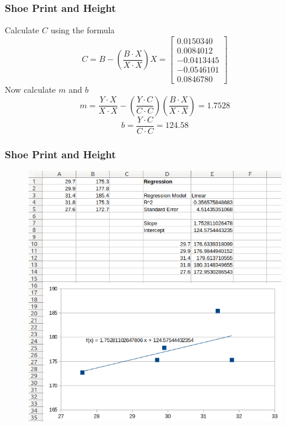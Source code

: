 \documentclass[xcolor=dvipsnames]{beamer}
\begin{document}
\begin{frame}
  \frametitle{Shoe Print and Height}
  Calculate $C$ using the formula
  \begin{equation}
    \label{eq:chawohph}
    C=B-\left(\frac{B\cdot{}X}{X\cdot{}X}\right)X=\left[
      \begin{array}{c}
   0.0150340 \\
   0.0084012 \\
  -0.0413445 \\
  -0.0546101 \\
   0.0846780
      \end{array}\right]
  \end{equation}
  Now calculate $m$ and $b$
    \begin{equation}
    \label{eq:thoemeir}
    m=\frac{Y\cdot{}X}{X\cdot{}X}-\left(\frac{Y\cdot{}C}{C\cdot{}C}\right)\left(\frac{B\cdot{}X}{X\cdot{}X}\right)=1.7528
  \end{equation}
  \begin{equation}
    \label{eq:ohwoiwoh}
    b=\frac{Y\cdot{}C}{C\cdot{}C}=124.58
  \end{equation}
\end{frame}

\begin{frame}
  \frametitle{Shoe Print and Height}
      \begin{figure}[h]
    \includegraphics[scale=0.4]{./diagrams/librelinreg.png}
  \end{figure}
\end{frame}
\end{document}
